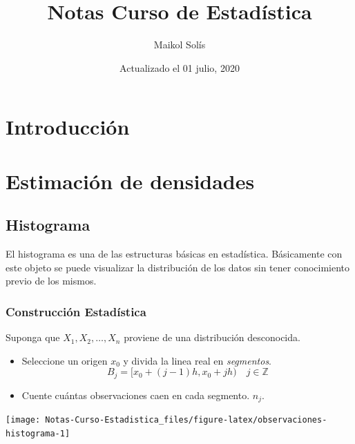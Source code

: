 \documentclass[
  12pt,
]{book}
\title{Notas Curso de Estadística}
\author{Maikol Solís}
\date{Actualizado el 01 julio, 2020}
\theoremstyle{definition}
\theoremstyle{definition}
\theoremstyle{definition}
\theoremstyle{remark}
\begin{document}
\maketitle

{
\hypersetup{linkcolor=}
\setcounter{tocdepth}{4}
\tableofcontents
}
\hypertarget{introducciuxf3n}{%
\chapter{Introducción}\label{introducciuxf3n}}

\hypertarget{estimaciuxf3n-de-densidades}{%
\chapter{Estimación de densidades}\label{estimaciuxf3n-de-densidades}}

\hypertarget{histograma}{%
\section{Histograma}\label{histograma}}

El histograma es una de las estructuras básicas en estadística. Básicamente con este objeto se puede visualizar la distribución de los datos sin tener conocimiento previo de los mismos.

\hypertarget{construcciuxf3n-estaduxedstica}{%
\subsection{Construcción Estadística}\label{construcciuxf3n-estaduxedstica}}

Suponga que \(X_1,X_2, \dots ,X_n\) proviene de una distribución desconocida.

\begin{itemize}
\item
  Seleccione un origen \(x_0\) y divida la linea real en \emph{segmentos}.
  \begin{equation*}
  B_j = [x_0 +(j - 1)h,x_0 + jh) \quad j\in \mathbb{Z}
  \end{equation*}
\item
  Cuente cuántas observaciones caen en cada segmento. \(n_j\).
\end{itemize}

\begin{center}\texttt{[image: Notas-Curso-Estadistica\_files/figure-latex/observaciones-histograma-1]} \end{center}
\end{document}
